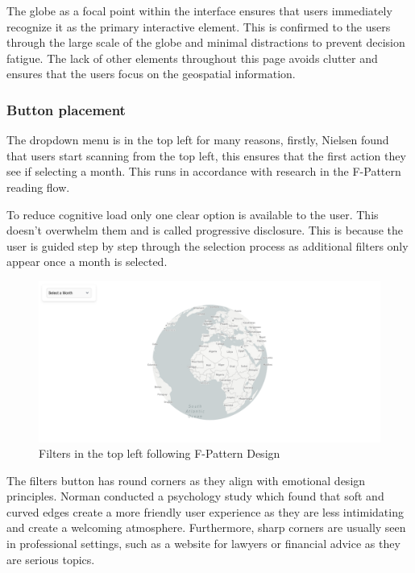 \documentclass[]{project_final}
\begin{document}
The globe as a focal point within the interface ensures that users immediately recognize it as the primary interactive element. This is confirmed to the users through the large scale of the globe and minimal distractions to prevent decision fatigue. The lack of other elements throughout this page avoids clutter and ensures that the users focus on the geospatial information.

\subsubsection{Button placement}

The dropdown menu is in the top left for many reasons, firstly, Nielsen found that users start scanning from the top left, this ensures that the first action they see if selecting a month. This runs in accordance with research in the F-Pattern reading flow.

To reduce cognitive load only one clear option is available to the user. This doesn't overwhelm them and is called progressive disclosure. This is because the user is guided step by step through the selection process as additional filters only appear once a month is selected.

\begin{figure}[ht!]
    \centering
    \includegraphics[width=\textwidth]{1.png}
    \caption{Filters in the top left following F-Pattern Design}
    \label{fig:1}
\end{figure}

The filters button has round corners as they align with emotional design principles. Norman conducted a psychology study which found that soft and curved edges create a more friendly user experience as they are less intimidating and create a welcoming atmosphere.  Furthermore, sharp corners are usually seen in professional settings, such as a website for lawyers or financial advice as they are serious topics.
\end{document}
